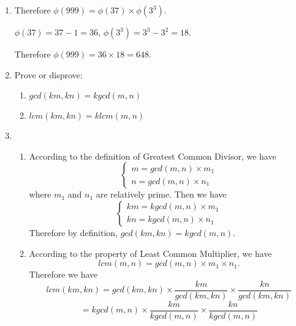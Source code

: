 \documentclass[12pt,a4paper]{article}
\makeatletter
\newtheorem*{solution}{Solution}
\theoremstyle{definition}
\renewenvironment{solution}[1][Solution] {\par\pushQED{\qed}\normalfont\topsep6\p@\@plus6\p@\relax\trivlist\item[\hskip\labelsep\bfseries#1\@addpunct{.}]\ignorespaces}{\popQED\endtrivlist\@endpefalse} \makeatother
\makeatother
\begin{document}
\begin{enumerate}
\begin{solution}
	    	Therefore $\phi(999)=\phi(37)\times\phi(3^3)$.
	    	
	    	$\phi(37)=37-1=36$, $\phi(3^3)=3^3-3^2=18$.
	    	
	    	Therefore $\phi(999)=36\times 18=648$.
	\end{solution}
    \item 
    Prove or disprove:
    \begin{enumerate}
        \item $gcd(km,kn)=k gcd(m,n)$
        \item $lcm(km,kn)=k lcm(m,n)$
    \end{enumerate}
    \begin{solution}
        \begin{enumerate}
            \item 
            According to the definition of Greatest Common Divisor, we have 
            \begin{equation*}
                \begin{cases}
                    m=gcd(m,n)\times m_1\\
                    n=gcd(m,n)\times n_1
                \end{cases}
            \end{equation*}
            where $m_1$ and $n_1$ are relatively prime.
            Then we have
            \begin{equation*}
                \begin{cases}
                    km=kgcd(m,n)\times m_1\\
                    kn=kgcd(m,n)\times n_1
                \end{cases}
            \end{equation*}
            Therefore by definition, $gcd(km,kn)=kgcd(m,n)$.
            \item 
            According to the property of Least Common Multiplier, we have
            \begin{equation*}
                    lcm(m,n)=gcd(m,n)\times m_1 \times n_1.
            \end{equation*}
            Therefore we have
            \begin{equation*}
                    lcm(km,kn)=gcd(km,kn)\times\frac{km}{gcd(km,kn)}\times \frac{kn}{gcd(km,kn)}
            \end{equation*}
            \begin{equation*}
                    =kgcd(m,n)\times \frac{km}{kgcd(m,n)}\times \frac{kn}{kgcd(m,n)}

\end{equation*}
\end{enumerate}
\end{solution}
\end{enumerate}
\end{document}

